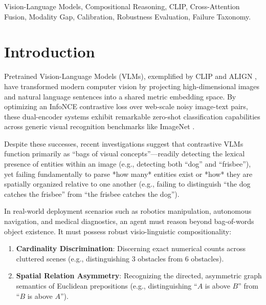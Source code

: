 \documentclass[conference]{IEEEtran}
\begin{document}
\begin{IEEEkeywords}
Vision-Language Models, Compositional Reasoning, CLIP, Cross-Attention Fusion, Modality Gap, Calibration, Robustness Evaluation, Failure Taxonomy.
\end{IEEEkeywords}

\section{Introduction}
\label{sec:introduction}
Pretrained Vision-Language Models (VLMs), exemplified by CLIP \cite{radford2021learning} and ALIGN \cite{jia2021scaling}, have transformed modern computer vision by projecting high-dimensional images and natural language sentences into a shared metric embedding space. By optimizing an InfoNCE contrastive loss over web-scale noisy image-text pairs, these dual-encoder systems exhibit remarkable zero-shot classification capabilities across generic visual recognition benchmarks like ImageNet \cite{recht2019imagenet}.

Despite these successes, recent investigations \cite{thrush2022winoground, yuksekgonul2023when, ma2023crepe} suggest that contrastive VLMs function primarily as ``bags of visual concepts''—readily detecting the lexical presence of entities within an image (e.g., detecting both ``dog'' and ``frisbee''), yet failing fundamentally to parse *how many* entities exist or *how* they are spatially organized relative to one another (e.g., failing to distinguish ``the dog catches the frisbee'' from ``the frisbee catches the dog'').

In real-world deployment scenarios such as robotics manipulation, autonomous navigation, and medical diagnostics, an agent must reason beyond bag-of-words object existence. It must possess robust visio-linguistic compositionality:
\begin{enumerate}
    \item \textbf{Cardinality Discrimination}: Discerning exact numerical counts across cluttered scenes (e.g., distinguishing 3 obstacles from 6 obstacles).
    \item \textbf{Spatial Relation Asymmetry}: Recognizing the directed, asymmetric graph semantics of Euclidean prepositions (e.g., distinguishing ``$A$ is above $B$'' from ``$B$ is above $A$'').
\end{enumerate}
\end{document}
